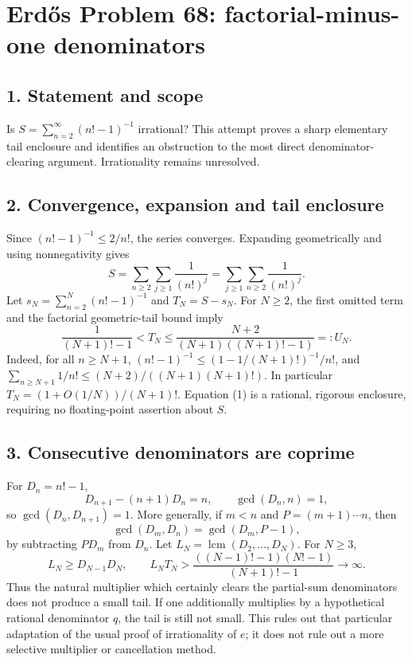 \section*{Erd\H{o}s Problem 68: factorial-minus-one denominators}
\subsection*{1. Statement and scope}
Is $S=\sum_{n=2}^{\infty}(n!-1)^{-1}$ irrational? This attempt proves a sharp elementary tail enclosure and identifies an obstruction to the most direct denominator-clearing argument. Irrationality remains unresolved.

\subsection*{2. Convergence, expansion and tail enclosure}
Since $(n!-1)^{-1}\le2/n!$, the series converges. Expanding geometrically and using nonnegativity gives
\[
 S=\sum_{n\ge2}\sum_{j\ge1}\frac1{(n!)^j}
  =\sum_{j\ge1}\sum_{n\ge2}\frac1{(n!)^j}.
\]
Let $s_N=\sum_{n=2}^N(n!-1)^{-1}$ and $T_N=S-s_N$. For $N\ge2$, the first omitted term and the factorial geometric-tail bound imply
\[
 \frac1{(N+1)!-1}<T_N\le
 \frac{N+2}{(N+1)((N+1)!-1)}=:U_N. \tag{1}
\]
Indeed, for all $n\ge N+1$,
$(n!-1)^{-1}\le(1-1/(N+1)!)^{-1}/n!$, and
$\sum_{n\ge N+1}1/n!\le (N+2)/((N+1)(N+1)!)$.
In particular $T_N=(1+O(1/N))/(N+1)!$. Equation (1) is a rational, rigorous enclosure, requiring no floating-point assertion about $S$.

\subsection*{3. Consecutive denominators are coprime}
For $D_n=n!-1$,
\[
 D_{n+1}-(n+1)D_n=n,
 \qquad \gcd(D_n,n)=1,
\]
so $\gcd(D_n,D_{n+1})=1$. More generally, if $m<n$ and $P=(m+1)\cdots n$, then
\[
 \gcd(D_m,D_n)=\gcd(D_m,P-1),
\]
by subtracting $P D_m$ from $D_n$.
Let $L_N=\operatorname{lcm}(D_2,\ldots,D_N)$. For $N\ge3$,
\[
 L_N\ge D_{N-1}D_N,
 \qquad
 L_N T_N>\frac{((N-1)!-1)(N!-1)}{(N+1)!-1}\longrightarrow\infty. \tag{2}
\]
Thus the natural multiplier which certainly clears the partial-sum denominators does not produce a small tail. If one additionally multiplies by a hypothetical rational denominator $q$, the tail is still not small. This rules out that particular adaptation of the usual proof of irrationality of $e$; it does not rule out a more selective multiplier or cancellation method.

